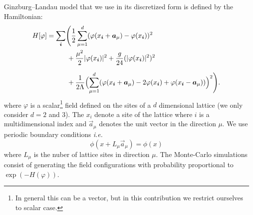 \documentclass[a4paper]{llncs}
\renewcommand{\a}[1]{\v{a}_{#1}}
\renewcommand{\v}[1]{\vec{#1}}
\newcommand{\vphi}{\varphi}
\newcommand{\vi}{{\vec{i}}}
\newcommand{\ie}{{\textit{i.e.}}}
\begin{document}
Ginzburg--Landau model that we use in its discretized form is defined by the
Hamiltonian\cite{parisi}:
\begin{equation*}\label{eq:hamiltonian}\begin{split}
H[\varphi]&=\sum_{\vi}\Biggl(
\frac{1}{2}\sum_{\mu=1}^d(\vphi(x_\vi+\a{\mu})-\vphi(x_\vi))^2\\
&\phantom{=\sum_{\vi}\bigl(}+\frac{\mu^2}{2}|\vphi(x_{\vi})|^2+
\frac{g}{24}(|\vphi(x_{\vi})|^2)^2\\
&\phantom{=\sum_{\vi}\bigl(}+
\frac{1}{2\Lambda}\Bigl(\sum_{\mu=1}^d
(\vphi(x_\vi+\a{\mu})-2\vphi(x_{\vi})+\vphi(x_\vi-\a\mu))\Bigr)^2\Biggr).
\end{split}
\end{equation*}
where $\vphi$ is a scalar\footnote{In general this can be a vector,
  but in this contribution we restrict ourselves to scalar case.} field
defined on the sites of a $d$ dimensional lattice (we only consider $d=2$ and $3$). The $x_i$
denote a site of the lattice where $i$ is a multidimensional index
and $\a\mu$ denotes the unit vector in the direction $\mu$. We use
periodic boundary conditions \ie
\begin{equation} 
\phi(x+L_{\mu}\a\mu)=\phi(x)
\end{equation}
where  $L_\mu$ is the nuber of lattice sites in direction $\mu$. 
The Monte-Carlo simulations consist of
generating the field configurations with probability proportional to
$\exp(-H(\vphi))$.
\end{document}
